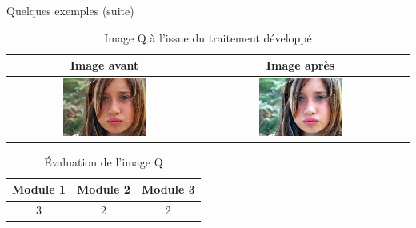 \documentclass{beamer}
\begin{document}
\begin{frame}{Quelques exemples (suite)}
\begin{table}
\centering
\begin{tabular}{|c|c|c|}	
\hline \textbf{Image avant}  &  \textbf{Image après}  \\ \hline 
\includegraphics[width=0.45\textwidth]{Resultats/pq_avant} & \includegraphics[width=0.45\textwidth]{Resultats/pq_apres} \\ \hline   
\end{tabular}
\caption{Image Q à l'issue du traitement développé}
\end{table}

\begin{table}[htbp]
\centering
\begin{tabular}{|c|c|c|}
\hline
Module 1 & Module 2 & Module 3\\ \hline
3 & 2 & 2\\ \hline
\end{tabular}
\caption{Évaluation de l'image Q}
\end{table}
\end{frame}
\end{document}
